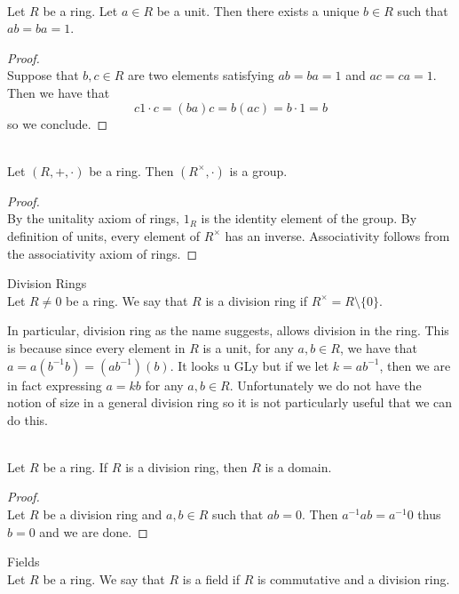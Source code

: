 \documentclass[a4paper]{article}
\begin{document}
\begin{lmm}{}{}\\
Let $R$ be a ring. Let $a\in R$ be a unit. Then there exists a unique $b\in R$ such that $ab=ba=1$. 
\begin{proof}\\
Suppose that $b,c\in R$ are two elements satisfying $ab=ba=1$ and $ac=ca=1$. Then we have that $$c1\cdot c=(ba)c=b(ac)=b\cdot 1=b$$ so we conclude. 
\end{proof}
\end{lmm}

\begin{prp}{}{}\\
Let $(R,+,\cdot)$ be a ring. Then $(R^\times,\cdot)$ is a group. 
\begin{proof}\\
By the unitality axiom of rings, $1_R$ is the identity element of the group. By definition of units, every element of $R^\times$ has an inverse. Associativity follows from the associativity axiom of rings. 
\end{proof}
\end{prp}

\begin{defn}{Division Rings}{}\\
Let $R\neq 0$ be a ring. We say that $R$ is a division ring if $R^\times=R\setminus\{0\}$. 
\end{defn}

In particular, division ring as the name suggests, allows division in the ring. This is because since every element in $R$ is a unit, for any $a,b\in R$, we have that $a=a(b^{-1}b)=(ab^{-1})(b)$. It looks u GLy but if we let $k=ab^{-1}$, then we are in fact expressing $a=kb$ for any $a,b\in R$. Unfortunately we do not have the notion of size in a general division ring so it is not particularly useful that we can do this. \\

\begin{prp}{}{}\\
Let $R$ be a ring. If $R$ is a division ring, then $R$ is a domain. 
\begin{proof}\\
Let $R$ be a division ring and $a,b\in R$ such that $ab=0$. Then $a^{-1}ab=a^{-1}0$ thus $b=0$ and we are done. 
\end{proof}
\end{prp}

\begin{defn}{Fields}{}\\
Let $R$ be a ring. We say that $R$ is a field if $R$ is commutative and a division ring. 
\end{defn}
\end{document}
